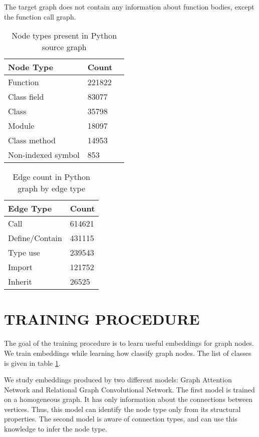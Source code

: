 \documentclass[a4paper,twoside]{article}
\begin{document}
The target graph does not contain any information about function bodies, except the function call graph.

\begin{table}[]
\centering
\begin{tabular}{|l|l|l|}
 \hline
Node Type        & Count  \\ \hline
Function        & 221822 \\ \hline
Class field     & 83077 \\ \hline
Class           & 35798 \\ \hline
Module          & 18097 \\ \hline
Class method    & 14953 \\ \hline
Non-indexed symbol  & 853  \\ \hline
\end{tabular}
\caption{Node types present in Python source graph \label{tbl:python_node_count}}
\end{table}

\begin{table}[]
\centering
\begin{tabular}{|l|l|}
\hline
Edge Type       & Count \\ \hline
Call            & 614621 \\ \hline
Define/Contain  & 431115 \\ \hline
Type use        & 239543 \\ \hline
Import          & 121752 \\ \hline
Inherit         & 26525 \\ \hline
\end{tabular}
\caption{Edge count in Python graph by edge type \label{tbl:python_edge_count}}
\end{table}

\section{\uppercase{Training Procedure}}

The goal of the training procedure is to learn useful embeddings for graph nodes. We train embeddings while learning how classify graph nodes. The list of classes is given in table \ref{tbl:python_node_count}.

We study embeddings produced by two different models: Graph Attention Network and Relational Graph Convolutional Network. The first model is trained on a homogeneous graph. It has only information about the connections between vertices. Thus, this model can identify the node type only from its structural properties. The second model is aware of connection types, and can use this knowledge to infer the node type.
\end{document}

